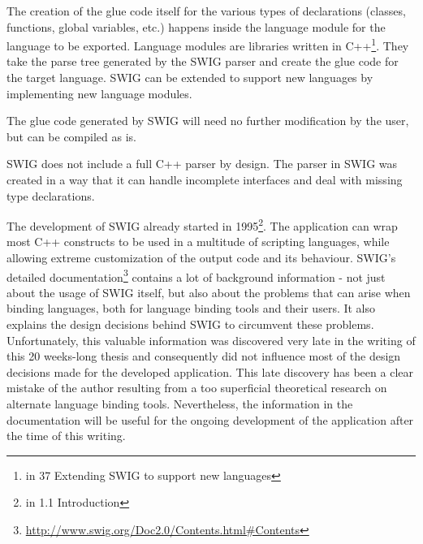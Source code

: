 The creation of the glue code itself for the various types of declarations (classes, functions, global variables, etc.) happens inside the language module for the language to be exported. Language modules are libraries written in C++\footnote{\citep{SWIGHPDoc} in 37 Extending SWIG to support new languages}. They take the parse tree generated by the SWIG parser and create the glue code for the target language. SWIG can be extended to support new languages by implementing new language modules.

The glue code generated by SWIG will need no further modification by the user, but can be compiled as is.

SWIG does not include a full C++ parser by design. The parser in SWIG was created in a way that it can handle incomplete interfaces and deal with missing type declarations.

The development of SWIG already started in 1995\footnote{\citep{SWIGHPDoc} in 1.1 Introduction}. The application can wrap most C++ constructs to be used in a multitude of scripting languages, while allowing extreme customization of the output code and its behaviour. SWIG's detailed documentation\footnote{\url{http://www.swig.org/Doc2.0/Contents.html\#Contents}} contains a lot of background information - not just about the usage of SWIG itself, but also about the problems that can arise when binding languages, both for language binding tools and their users. It also explains the design decisions behind SWIG to circumvent these problems.
\\Unfortunately, this valuable information was discovered very late in the writing of this 20 weeks-long thesis and consequently did not influence most of the design decisions made for the developed application. This late discovery has been a clear mistake of the author resulting from a too superficial theoretical research on alternate language binding tools. Nevertheless, the information in the documentation will be useful for the ongoing development of the application after the time of this writing.


